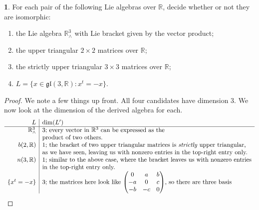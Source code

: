 \documentclass[12pt]{article}
\newcommand{\gl}{\mathfrak{gl}}
\theoremstyle{definition}
\newtheorem{ex}{}
\begin{document}
\begin{ex}
	For each pair of the following Lie algebras over $\mathbb{R}$, decide whether or not they are isomorphic: \begin{enumerate}[label=(\alph*)]
		\item the Lie algebra $\mathbb{R}^3_\wedge$ with Lie bracket given by the vector product;
		\item the upper triangular $2 \times 2$ matrices over $\mathbb{R}$;
		\item the strictly upper triangular $3 \times 3$ matrices over $\mathbb{R}$;
		\item $L = \lbrace x \in \gl(3, \mathbb{R}) : x^t = -x \rbrace$.
	\end{enumerate}
\end{ex}
\begin{proof}
	We note a few things up front.
	All four candidates have dimension 3.
	We now look at the dimension of the derived algebra for each. \begin{equation*}
		\begin{array}{r|l}
			L                        & \mathrm{dim}(L')                                                                                                                      \\\hline
			\mathbb{R}^3_\wedge      & \text{3; every vector in $\mathbb{R}^3$ can be expressed as the}                                                                      \\
			                         & \text{product of two others.}                                                                                                          \\
			b(2, \mathbb{R})         & \text{1; the bracket of two upper triangular matrices is \textit{strictly} upper triangular,}                                         \\
			                         & \text{as we have seen, leaving us with nonzero entries in the top-right entry only.}                                                   \\
			n(3, \mathbb{R})         & \text{1; similar to the above case, where the bracket leaves us with nonzero entries}                                                 \\
			                         & \text    {in the top-right entry only.}                                                                                                \\
			\lbrace x^t = -x \rbrace & \text{3; the matrices here look like $\begin{pmatrix} 0 & a & b \\ -a & 0 & c \\ -b & -c & 0\end{pmatrix}$, so there are three basis} \\

\end{array}
\end{equation*}
\end{proof}
\end{document}
